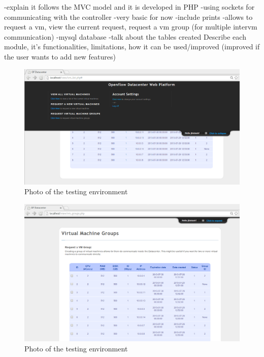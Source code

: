 \documentclass[12pt,english,oneside]{book}
\begin{document}
-explain it follows the MVC model and it is developed in PHP
-using sockets for communicating with the controller
-very basic for now
-include prints
-allows to request a vm, view the current request, request a vm group (for multiple intervm communication)
-mysql database
 -talk about the tables created
Describe each module, it's functionalities, limitations, how it can be used/improved (improved if the user wants to add new features)

\begin{figure}[htbp]
        \centering
        \includegraphics[width=1\textwidth]{figures/webplat_panel.png}
        \caption{Photo of the testing environment}
        \label{fig:realenv}
\end{figure}

\begin{figure}[htbp]
        \centering
        \includegraphics[width=1\textwidth]{figures/webplat_vmgroup.png}
        \caption{Photo of the testing environment}
        \label{fig:realenv}
\end{figure}
\end{document}
